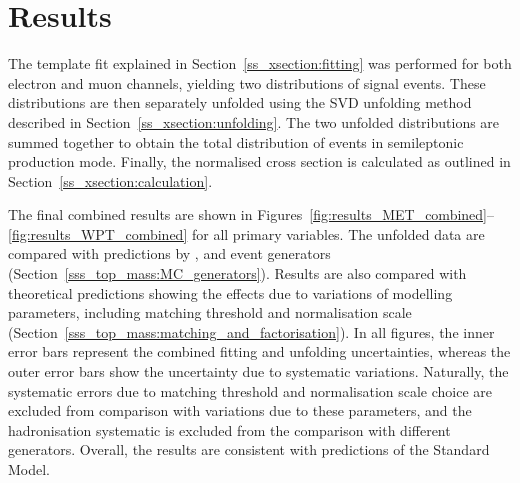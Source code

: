 
\section{Results}
\label{s_xsection:results}
The template fit explained in Section~\ref{ss_xsection:fitting} was performed for both electron and muon channels,
yielding two distributions of signal \ttbar events. These distributions are then separately unfolded using the SVD
unfolding method described in Section~\ref{ss_xsection:unfolding}. The two unfolded distributions are summed together to
obtain the total distribution of \ttbar events in semileptonic production mode. Finally, the normalised cross section is
calculated as outlined in Section~\ref{ss_xsection:calculation}.

The final combined results are shown in Figures~\ref{fig:results_MET_combined}--\ref{fig:results_WPT_combined} for all
primary variables. The unfolded data are compared with predictions by \MADGRAPH, \POWHEG and \MCATNLO event generators
(Section~\ref{sss_top_mass:MC_generators}). Results are also compared with theoretical predictions showing
the effects due to variations of modelling parameters, including matching threshold and normalisation scale
(Section~\ref{sss_top_mass:matching_and_factorisation}). In all figures, the inner error bars represent the combined
fitting and unfolding uncertainties, whereas the outer error bars show the uncertainty due to systematic variations.
Naturally, the systematic errors due to matching threshold and normalisation scale choice are excluded from comparison
with variations due to these parameters, and the hadronisation systematic is excluded from the comparison with
different generators. Overall, the results are consistent with predictions of the Standard Model.


